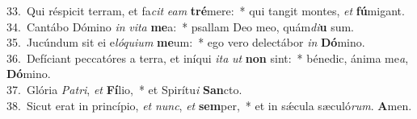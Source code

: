 {33.~}Qui réspicit terram, et fa\textit{cit} \textit{e}\textit{am} \textbf{tré}mere:~* qui tangit montes, \textit{et} \textbf{fú}migant.\\
{34.~}Cantábo Dómino \textit{in} \textit{vi}\textit{ta} \textbf{me}a:~* psallam Deo meo, quám\textit{di}\textbf{u} sum.\\
{35.~}Jucúndum sit ei e\textit{ló}\textit{qui}\textit{um} \textbf{me}um:~* ego vero delectábor \textit{in} \textbf{Dó}mino.\\
{36.~}Defíciant peccatóres a terra, et iníqui \textit{i}\textit{ta} \textit{ut} \textbf{non} sint:~* bénedic, ánima me\textit{a}, \textbf{Dó}mino.\\
{37.~}Glória \textit{Pa}\textit{tri}, \textit{et} \textbf{Fí}lio,~* et Spirítu\textit{i} \textbf{San}cto.\\
{38.~}Sicut erat in princípio, \textit{et} \textit{nunc}, \textit{et} \textbf{sem}per,~* et in sǽcula sæculó\textit{rum}. \textbf{A}men.\\
